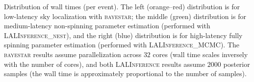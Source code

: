 \label{fig:wall-time} Distribution of wall times (per event). The left (orange--red) distribution is for low-latency sky localization with \textsc{bayestar}; the middle (green) distribution is for medium-latency non-spinning parameter estimation (performed with \textsc{LALInference\_nest}), and the right (blue) distribution is for high-latency fully spinning parameter estimation (performed with \textsc{LALInference\_MCMC}). The \textsc{bayestar} results assume parallelization across $32$ cores (wall time scales inversely with the number of cores), and both \textsc{LALInference} results assume $2000$ posterior samples (the wall time is approximately proportional to the number of samples).
  
  